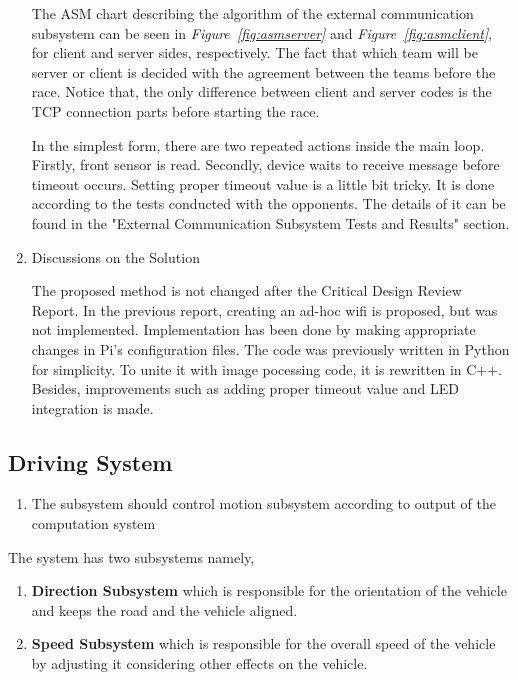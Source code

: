\documentclass[a4paper,12pt]{article}
\begin{document}
\begin{enumerate}
	
	The ASM chart describing the algorithm of the external communication subsystem can be seen in \textit{Figure~\ref{fig:asmserver}} and \textit{Figure~\ref{fig:asmclient}}, for client and server sides, respectively. The fact that which team will be server or client is decided with the agreement between the teams before the race. Notice that, the only difference between client and server codes is the TCP connection parts before starting the race. 
	
	In the simplest form, there are two repeated actions inside the main loop. Firstly, front sensor is read. Secondly, device waits to receive message before timeout occurs. Setting proper timeout value is a little bit tricky. It is done according to the tests conducted with the opponents. The details of it can be found in the "External Communication Subsystem Tests and Results" section.
	
	
	\item {Discussions on the Solution}
	
	The proposed method is not changed after the Critical Design Review Report. In the previous report, creating an ad-hoc wifi is proposed, but was not implemented. Implementation has been done by making appropriate changes in Pi's configuration files. The code was previously written in Python for simplicity. To unite it with image pocessing code, it is rewritten in C++. Besides, improvements such as adding proper timeout value and LED integration is made.
\end{enumerate}




\subsection{Driving System}



	\begin{enumerate}
		\item The subsystem should control motion subsystem according to output of the computation system		
	\end{enumerate}

	The system has two subsystems namely,
		
	\begin{enumerate}
		\item \textbf{Direction Subsystem} which is responsible for the orientation of the vehicle and keeps the road and the vehicle aligned.
		\item \textbf{Speed Subsystem} which is responsible for the overall speed of the vehicle by adjusting it considering other effects on the vehicle.
	\end{enumerate}
\end{document}
